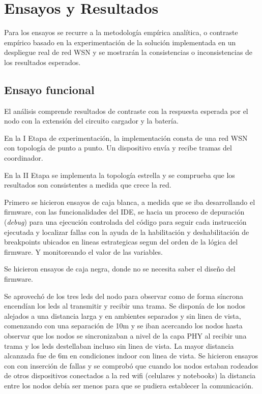 
\chapter{Ensayos y Resultados} %
\label{Chapter4} 
Para los ensayos se recurre a la metodología empírica analítica, o contraste empírico basado en la experimentación de la solución implementada en un despliegue real de red WSN y se mostrarán la consistencias o inconsistencias de los resultados esperados.


\section{Ensayo funcional}
\label{sec:funcional}

El análisis comprende resultados de contraste con la respuesta esperada por el nodo con la extensión del circuito cargador y la batería.

En la I Etapa de experimentación, la implementación consta de una red WSN con topología de punto a punto. Un dispositivo envía y recibe tramas del coordinador.

En la II Etapa se implementa la topología estrella y se comprueba que los resultados son consistentes a medida que crece la red.

Primero se hicieron ensayos de caja blanca, a medida que se iba desarrollando el firmware, con las funcionalidades del IDE, se hacia un proceso de depuración (\textit{debug}) para una ejecución controlada del código para seguir cada instrucción ejecutada y localizar fallas con la ayuda de la habilitación y deshabilitación de breakpoints ubicados en lineas estrategicas segun del orden de la lógica del firmware. Y monitoreando el valor de las variables.

Se hicieron ensayos de caja negra, donde no se necesita saber el diseño del firmware.

Se aprovechó de los tres leds del nodo para observar como de forma síncrona encendían los leds al transmitir y recibir una trama. Se disponía de los nodos alejados a una distancia larga y en ambientes separados y sin linea de vista, comenzando con una separación de 10m y se iban acercando los nodos hasta observar que los nodos se sincronizaban a nivel de la capa PHY al recibir una trama y los leds destellaban incluso sin linea de vista. La mayor distancia alcanzada fue de 6m en condiciones indoor con linea de vista. Se hicieron ensayos con con inserción de fallas y se comprobó que cuando los nodos estaban rodeados de otros dispositivos conectados a la red wifi (celulares y notebooks) la distancia entre los nodos debía ser menos para que se pudiera establecer la comunicación.

